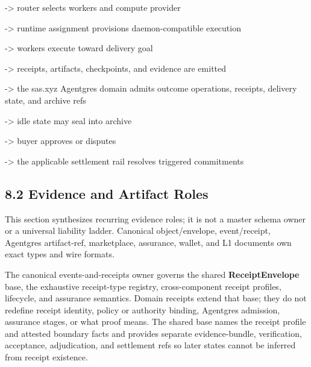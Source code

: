 \documentclass[
  11pt,
]{article}
\begin{document}
-\textgreater{} router selects workers and compute provider

-\textgreater{} runtime assignment provisions daemon-compatible
execution

-\textgreater{} workers execute toward delivery goal

-\textgreater{} receipts, artifacts, checkpoints, and evidence are
emitted

-\textgreater{} the sas.xyz Agentgres domain admits outcome operations,
receipts, delivery state, and archive refs

-\textgreater{} idle state may seal into archive

-\textgreater{} buyer approves or disputes

-\textgreater{} the applicable settlement rail resolves triggered commitments

\hypertarget{evidence-and-artifact-roles}{%
\subsection{8.2 Evidence and Artifact
Roles}\label{evidence-and-artifact-roles}}

This section synthesizes recurring evidence roles; it is not a master schema
owner or a universal liability ladder. Canonical object/envelope,
event/receipt, Agentgres artifact-ref, marketplace, assurance, wallet, and L1
documents own exact types and wire formats.

The canonical events-and-receipts owner governs the shared
\textbf{ReceiptEnvelope} base, the exhaustive receipt-type registry,
cross-component receipt profiles, lifecycle, and assurance semantics. Domain
receipts extend that base; they do not redefine receipt identity, policy or
authority binding, Agentgres admission, assurance stages, or what proof means.
The shared base names the receipt profile and attested boundary facts and
provides separate evidence-bundle, verification, acceptance, adjudication, and
settlement refs so later states cannot be inferred from receipt existence.
\end{document}

